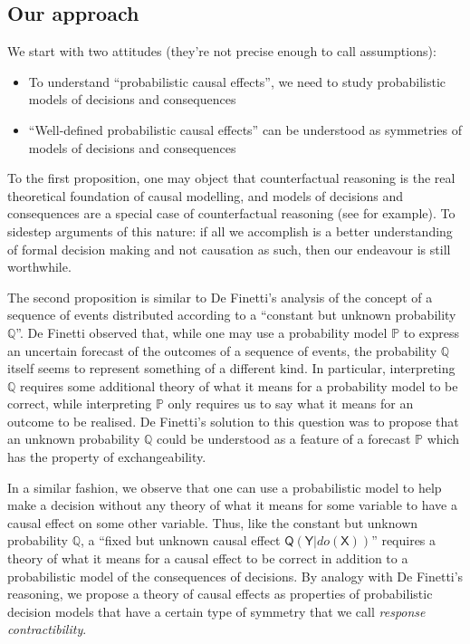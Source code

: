 \documentclass{article}
\theoremstyle{plain}
\theoremstyle{definition}
\newcommand{\RV}[1]{\ensuremath{\mathsf{#1}}}
\newcommand{\prob}[1]{\ensuremath{\mathbb{#1}}}
\begin{document}
\subsection{Our approach}

We start with two attitudes (they're not precise enough to call assumptions):
\begin{itemize}
  \item To understand ``probabilistic causal effects'', we need to study probabilistic models of decisions and consequences
  \item ``Well-defined probabilistic causal effects'' can be understood as symmetries of models of decisions and consequences
\end{itemize}

To the first proposition, one may object that counterfactual reasoning is the real theoretical foundation of causal modelling, and models of decisions and consequences are a special case of counterfactual reasoning (see \citet{pearl_book_2018} for example). To sidestep arguments of this nature: if all we accomplish is a better understanding of formal decision making and not causation as such, then our endeavour is still worthwhile. 

The second proposition is similar to De Finetti's analysis of the concept of a sequence of events distributed according to a ``constant but unknown probability $\prob{Q}$''. De Finetti observed that, while one may use a probability model $\prob{P}$ to express an uncertain forecast of the outcomes of a sequence of events, the probability $\prob{Q}$ itself seems to represent something of a different kind. In particular, interpreting $\prob{Q}$ requires some additional theory of what it means for a probability model to be correct, while interpreting $\prob{P}$ only requires us to say what it means for an outcome to be realised. De Finetti's solution to this question was to propose that an unknown probability $\prob{Q}$ could be understood as a feature of a forecast $\prob{P}$ which has the property of exchangeability.

In a similar fashion, we observe that one can use a probabilistic model to help make a decision without any theory of what it means for some variable to have a causal effect on some other variable. Thus, like the constant but unknown probability $\prob{Q}$, a ``fixed but unknown causal effect $\RV{Q}(\RV{Y}|do(\RV{X}))$'' requires a theory of what it means for a causal effect to be correct in addition to a probabilistic model of the consequences of decisions. By analogy with De Finetti's reasoning, we propose a theory of causal effects as properties of probabilistic decision models that have a certain type of symmetry that we call \emph{response contractibility}.
\end{document}

